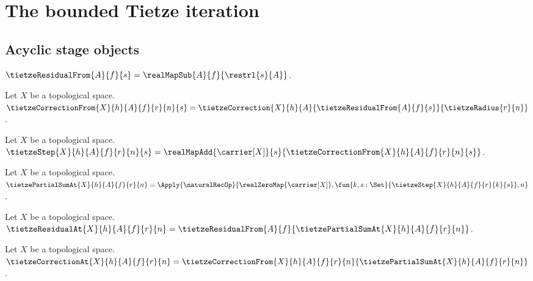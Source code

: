 

\section{The bounded Tietze iteration}

\subsection{Acyclic stage objects}

\begin{definition}\label{tietze_residual_from}
    $\tietzeResidualFrom{A}{f}{s}
        =\realMapSub{A}{f}{\restrl{s}{A}}$.
\end{definition}

\begin{definition}\label{tietze_correction_from}
    Let $X$ be a topological space.
    $\tietzeCorrectionFrom{X}{h}{A}{f}{r}{n}{s}
        =\tietzeCorrection{X}{h}{A}
            {\tietzeResidualFrom{A}{f}{s}}
            {\tietzeRadius{r}{n}}$.
\end{definition}

\begin{definition}\label{tietze_step}
    Let $X$ be a topological space.
    $\tietzeStep{X}{h}{A}{f}{r}{n}{s}
        =\realMapAdd{\carrier[X]}{s}
            {\tietzeCorrectionFrom{X}{h}{A}{f}{r}{n}{s}}$.
\end{definition}

\begin{definition}\label{tietze_partial_sum_at}
    Let $X$ be a topological space.
    $\tietzePartialSumAt{X}{h}{A}{f}{r}{n}
        =\Apply{\naturalRecOp}
            {\realZeroMap{\carrier[X]},
             \fun{k,s:\Set}{\tietzeStep{X}{h}{A}{f}{r}{k}{s}},n}$.
\end{definition}

\begin{definition}\label{tietze_residual_at}
    Let $X$ be a topological space.
    $\tietzeResidualAt{X}{h}{A}{f}{r}{n}
        =\tietzeResidualFrom{A}{f}
            {\tietzePartialSumAt{X}{h}{A}{f}{r}{n}}$.
\end{definition}

\begin{definition}\label{tietze_correction_at}
    Let $X$ be a topological space.
    $\tietzeCorrectionAt{X}{h}{A}{f}{r}{n}
        =\tietzeCorrectionFrom{X}{h}{A}{f}{r}{n}
            {\tietzePartialSumAt{X}{h}{A}{f}{r}{n}}$.
\end{definition}

